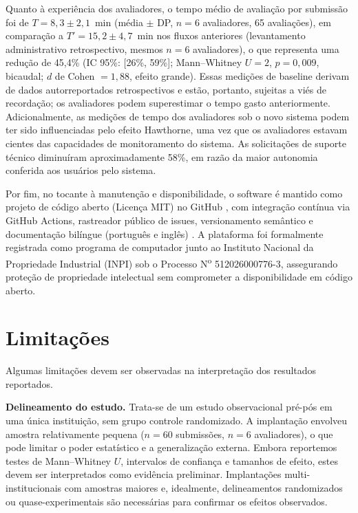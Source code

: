 \documentclass[preprint,12pt,a4paper]{elsarticle}
\begin{document}
Quanto à experiência dos avaliadores, o tempo médio de avaliação por submissão foi de $T = 8{,}3 \pm 2{,}1$~min (média $\pm$ DP, $n = 6$ avaliadores, 65 avaliações), em comparação a $T' = 15{,}2 \pm 4{,}7$~min nos fluxos anteriores (levantamento administrativo retrospectivo, mesmos $n = 6$ avaliadores), o que representa uma redução de 45,4\% (IC 95\%: [26\%, 59\%]; Mann--Whitney $U = 2$, $p = 0{,}009$, bicaudal; $d$ de Cohen $= 1{,}88$, efeito grande). Essas medições de baseline derivam de dados autorreportados retrospectivos e estão, portanto, sujeitas a viés de recordação; os avaliadores podem superestimar o tempo gasto anteriormente. Adicionalmente, as medições de tempo dos avaliadores sob o novo sistema podem ter sido influenciadas pelo efeito Hawthorne, uma vez que os avaliadores estavam cientes das capacidades de monitoramento do sistema. As solicitações de suporte técnico diminuíram aproximadamente 58\%, em razão da maior autonomia conferida aos usuários pelo sistema.


Por fim, no tocante à manutenção e disponibilidade, o software é mantido como projeto de código aberto (Licença MIT) no GitHub \citep{AvaliaMoreGitHub2026,AvaliaMoreDesktop2026}, com integração contínua via GitHub Actions, rastreador público de issues, versionamento semântico e documentação bilíngue (português e inglês) \citep{Sommerville2016}. A plataforma foi formalmente registrada como programa de computador junto ao Instituto Nacional da Propriedade Industrial (INPI) sob o Processo N\textsuperscript{o} 512026000776-3, assegurando proteção de propriedade intelectual sem comprometer a disponibilidade em código aberto.

\section{Limitações}

Algumas limitações devem ser observadas na interpretação dos resultados reportados.

\textbf{Delineamento do estudo.} Trata-se de um estudo observacional pré-pós em uma única instituição, sem grupo controle randomizado. A implantação envolveu amostra relativamente pequena ($n = 60$ submissões, $n = 6$ avaliadores), o que pode limitar o poder estatístico e a generalização externa. Embora reportemos testes de Mann--Whitney $U$, intervalos de confiança e tamanhos de efeito, estes devem ser interpretados como evidência preliminar. Implantações multi-institucionais com amostras maiores e, idealmente, delineamentos randomizados ou quase-experimentais são necessárias para confirmar os efeitos observados.
\end{document}
